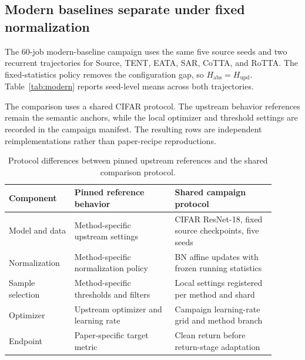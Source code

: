 \documentclass[11pt]{article}
\begin{document}
\subsection{Modern baselines separate under fixed normalization}
\label{sec:modern-baselines}

The 60-job modern-baseline campaign uses the same five source seeds and two recurrent trajectories for Source, TENT, EATA, SAR, CoTTA, and RoTTA. The fixed-statistics policy removes the configuration gap, so $H_{\mathrm{abs}}=H_{\mathrm{upd}}$. Table~\ref{tab:modern} reports seed-level means across both trajectories.

The comparison uses a shared CIFAR protocol. The upstream behavior references remain the semantic anchors, while the local optimizer and threshold settings are recorded in the campaign manifest. The resulting rows are independent reimplementations rather than paper-recipe reproductions.

\begin{table}[t]
\centering\scriptsize
\caption{Protocol differences between pinned upstream references and the shared comparison protocol.}
\label{tab:protocol-differences}
\begin{tabular}{p{0.22\linewidth}p{0.34\linewidth}p{0.34\linewidth}}
\toprule
Component & Pinned reference behavior & Shared campaign protocol\\
\midrule
Model and data & Method-specific upstream settings & CIFAR ResNet-18, fixed source checkpoints, five seeds\\
Normalization & Method-specific normalization policy & BN affine updates with frozen running statistics\\
Sample selection & Method-specific thresholds and filters & Local settings registered per method and shard\\
Optimizer & Upstream optimizer and learning rate & Campaign learning-rate grid and method branch\\
Endpoint & Paper-specific target metric & Clean return before return-stage adaptation\\
\bottomrule
\end{tabular}
\end{table}
\end{document}
